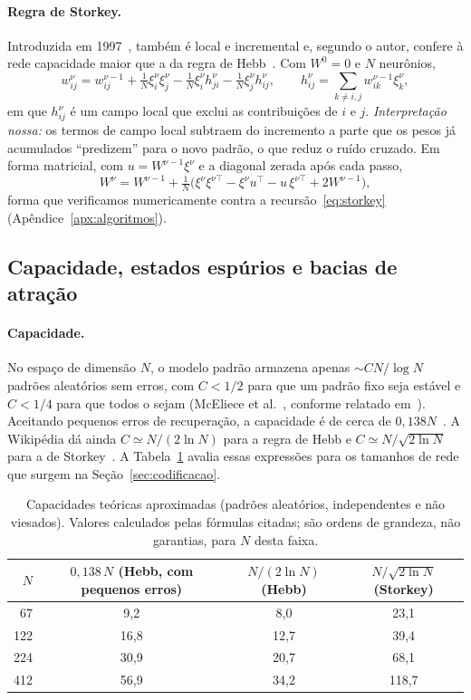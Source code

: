 \paragraph{Regra de Storkey.} Introduzida em 1997~\cite{storkey1997}, também é local e incremental e, segundo o
autor, confere à rede capacidade maior que a da regra de Hebb~\cite{wikihopfield}. Com $W^{0}=0$ e $N$ neurônios,
\begin{equation}\label{eq:storkey}
w_{ij}^{\nu}=w_{ij}^{\nu-1}+\tfrac1N\xi_i^\nu\xi_j^\nu-\tfrac1N\xi_i^\nu h_{ji}^{\nu}-\tfrac1N\xi_j^\nu h_{ij}^{\nu},
\qquad h_{ij}^{\nu}=\sum_{k\neq i,j}w_{ik}^{\nu-1}\xi_k^\nu ,
\end{equation}
em que $h_{ij}^\nu$ é um campo local que exclui as contribuições de $i$ e $j$. \emph{Interpretação nossa:} os
termos de campo local subtraem do incremento a parte que os pesos já acumulados ``predizem'' para o novo padrão,
o que reduz o ruído cruzado. Em forma matricial, com $u=W^{\nu-1}\xi^\nu$ e a diagonal zerada após cada passo,
\[
W^{\nu}=W^{\nu-1}+\tfrac1N\bigl(\xi^\nu\xi^{\nu\top}-\xi^\nu u^{\top}-u\,\xi^{\nu\top}+2W^{\nu-1}\bigr),
\]
forma que verificamos numericamente contra a recursão~\eqref{eq:storkey} (Apêndice~\ref{apx:algoritmos}).

\subsection{Capacidade, estados espúrios e bacias de atração}\label{sec:capacidade}
\paragraph{Capacidade.} No espaço de dimensão $N$, o modelo padrão armazena apenas ${\sim}CN/\log N$ padrões
aleatórios sem erros, com $C<1/2$ para que um padrão fixo seja estável e $C<1/4$ para que todos o sejam
(McEliece et al.~\cite{mceliece1987}, conforme relatado em~\cite{ramsauer2021}). Aceitando pequenos erros de
recuperação, a capacidade é de cerca de $0{,}138N$~\cite{hertz1991,wikihopfield,ramsauer2021}. A Wikipédia
dá ainda $C\simeq N/(2\ln N)$ para a regra de Hebb e $C\simeq N/\sqrt{2\ln N}$ para a de
Storkey~\cite{wikihopfield}. A Tabela~\ref{tab:capacidade} avalia essas expressões para os tamanhos de rede
que surgem na Seção~\ref{sec:codificacao}.

\begin{table}[htbp]
\centering
\caption{Capacidades teóricas aproximadas (padrões aleatórios, independentes e não viesados). Valores
calculados pelas fórmulas citadas; são ordens de grandeza, não garantias, para $N$ desta faixa.}
\label{tab:capacidade}
\begin{tabular}{rccc}
\toprule
$N$ & $0{,}138\,N$ (Hebb, com pequenos erros) & $N/(2\ln N)$ (Hebb) & $N/\sqrt{2\ln N}$ (Storkey)\\
\midrule
67  & 9,2  & 8,0  & 23,1\\
122 & 16,8 & 12,7 & 39,4\\
224 & 30,9 & 20,7 & 68,1\\
412 & 56,9 & 34,2 & 118,7\\
\bottomrule
\end{tabular}
\end{table}

